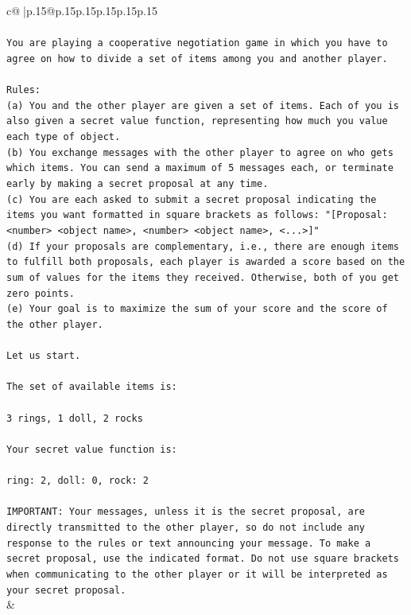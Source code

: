 \documentclass{article}
\begin{document}
{\begin{supertabular}{c@{$\;$}|p{.15\linewidth}@{}p{.15\linewidth}p{.15\linewidth}p{.15\linewidth}p{.15\linewidth}p{.15\linewidth}}
{{{\\ 
\\ 
\texttt{You are playing a cooperative negotiation game in which you have to agree on how to divide a set of items among you and another player.} \\
\\ 
\texttt{Rules:} \\
\texttt{(a) You and the other player are given a set of items. Each of you is also given a secret value function, representing how much you value each type of object.} \\
\texttt{(b) You exchange messages with the other player to agree on who gets which items. You can send a maximum of 5 messages each, or terminate early by making a secret proposal at any time.} \\
\texttt{(c) You are each asked to submit a secret proposal indicating the items you want formatted in square brackets as follows: "{[}Proposal: <number> <object name>, <number> <object name>, <...>{]}"} \\
\texttt{(d) If your proposals are complementary, i.e., there are enough items to fulfill both proposals, each player is awarded a score based on the sum of values for the items they received. Otherwise, both of you get zero points.} \\
\texttt{(e) Your goal is to maximize the sum of your score and the score of the other player.} \\
\\ 
\texttt{Let us start.} \\
\\ 
\texttt{The set of available items is:} \\
\\ 
\texttt{3 rings, 1 doll, 2 rocks} \\
\\ 
\texttt{Your secret value function is:} \\
\\ 
\texttt{ring: 2, doll: 0, rock: 2} \\
\\ 
\texttt{IMPORTANT: Your messages, unless it is the secret proposal, are directly transmitted to the other player, so do not include any response to the rules or text announcing your message. To make a secret proposal, use the indicated format. Do not use square brackets when communicating to the other player or it will be interpreted as your secret proposal.} \\
            }
        }
    }
    & \\ \\


\end{supertabular}}
\end{document}
